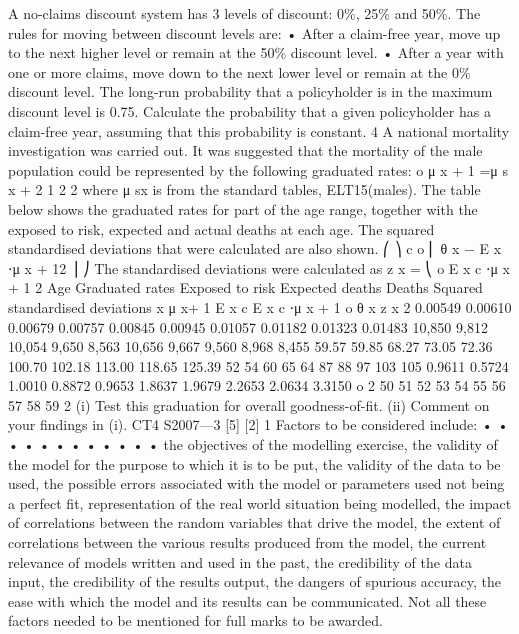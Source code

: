 \documentclass[a4paper,12pt]{article}
\begin{document}
\begin{enumerate}
A no-claims discount system has 3 levels of discount: 0\%, 25\% and 50\%. The rules for moving between discount levels are:
• After a claim-free year, move up to the next higher level or remain at the 50\% discount level.
• After a year with one or more claims, move down to the next lower level or remain at the 0\% discount level.
The long-run probability that a policyholder is in the maximum discount level is 0.75. Calculate the probability that a given policyholder has a claim-free year, assuming that this probability is constant.
4
A national mortality investigation was carried out. It was suggested that the mortality of the male population could be represented by the following graduated rates:
o
μ x + 1 =μ s x + 2 1
2
2
where μ sx is from the standard tables, ELT15(males).
The table below shows the graduated rates for part of the age range, together with the exposed to risk, expected and actual deaths at each age. The squared standardised
deviations that were calculated are also shown.
⎛
⎞
c o
⎜ θ x − E x ⋅μ x + 12 ⎟
⎠
The standardised deviations were calculated as z x = ⎝
o
E x c ⋅μ x + 1
2
Age Graduated
rates
Exposed
to risk Expected
deaths Deaths Squared
standardised
deviations
x μ x+ 1 E x c E x c ⋅μ x + 1 o θ x z x 2
0.00549
0.00610
0.00679
0.00757
0.00845
0.00945
0.01057
0.01182
0.01323
0.01483 10,850
9,812
10,054
9,650
8,563
10,656
9,667
9,560
8,968
8,455 59.57
59.85
68.27
73.05
72.36
100.70
102.18
113.00
118.65
125.39 52
54
60
65
64
87
88
97
103
105 0.9611
0.5724
1.0010
0.8872
0.9653
1.8637
1.9679
2.2653
2.0634
3.3150
o
2
50
51
52
53
54
55
56
57
58
59
2
(i) Test this graduation for overall goodness-of-fit.
(ii) Comment on your findings in (i).
CT4 S2007—3
[5]
[2]
1
Factors to be considered include:
•
•
•
•
•
•
•
•
•
•
•
•
the objectives of the modelling exercise,
the validity of the model for the purpose to which it is to be put,
the validity of the data to be used,
the possible errors associated with the model or parameters used not being a
perfect fit,
representation of the real world situation being modelled,
the impact of correlations between the random variables that drive the model,
the extent of correlations between the various results produced from the model,
the current relevance of models written and used in the past,
the credibility of the data input,
the credibility of the results output,
the dangers of spurious accuracy,
the ease with which the model and its results can be communicated.
Not all these factors needed to be mentioned for full marks to be awarded.

\end{enumerate}
\end{document}
